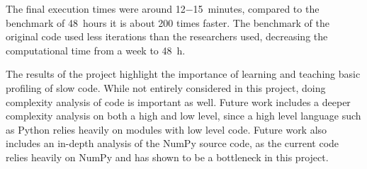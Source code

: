 \documentclass[12pt, a4paper]{article}
\begin{document}
The final execution times were around \SI[parse-numbers=false]{12-15}{minutes}, compared to the benchmark of \SI{48}{hours} it is about 200 times faster.
The benchmark of the original code used less iterations than the researchers used, decreasing the computational time from a week to \SI{48}{\hour}.

The results of the project highlight the importance of learning and teaching basic profiling of slow code.
While not entirely considered in this project, doing complexity analysis of code is important as well.
Future work includes a deeper complexity analysis on both a high and low level, since a high level language such as Python relies heavily on modules with low level code.
Future work also includes an in-depth analysis of the NumPy source code, as the current code relies heavily on NumPy and has shown to be a bottleneck in this project.
\end{document}

